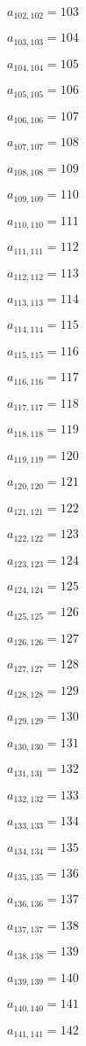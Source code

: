 \documentclass[a4paper,12pt]{article}
\begin{document}
$a _{ 102, 102 } = 103$

$a _{ 103, 103 } = 104$

$a _{ 104, 104 } = 105$

$a _{ 105, 105 } = 106$

$a _{ 106, 106 } = 107$

$a _{ 107, 107 } = 108$

$a _{ 108, 108 } = 109$

$a _{ 109, 109 } = 110$

$a _{ 110, 110 } = 111$

$a _{ 111, 111 } = 112$

$a _{ 112, 112 } = 113$

$a _{ 113, 113 } = 114$

$a _{ 114, 114 } = 115$

$a _{ 115, 115 } = 116$

$a _{ 116, 116 } = 117$

$a _{ 117, 117 } = 118$

$a _{ 118, 118 } = 119$

$a _{ 119, 119 } = 120$

$a _{ 120, 120 } = 121$

$a _{ 121, 121 } = 122$

$a _{ 122, 122 } = 123$

$a _{ 123, 123 } = 124$

$a _{ 124, 124 } = 125$

$a _{ 125, 125 } = 126$

$a _{ 126, 126 } = 127$

$a _{ 127, 127 } = 128$

$a _{ 128, 128 } = 129$

$a _{ 129, 129 } = 130$

$a _{ 130, 130 } = 131$

$a _{ 131, 131 } = 132$

$a _{ 132, 132 } = 133$

$a _{ 133, 133 } = 134$

$a _{ 134, 134 } = 135$

$a _{ 135, 135 } = 136$

$a _{ 136, 136 } = 137$

$a _{ 137, 137 } = 138$

$a _{ 138, 138 } = 139$

$a _{ 139, 139 } = 140$

$a _{ 140, 140 } = 141$

$a _{ 141, 141 } = 142$
\end{document}
